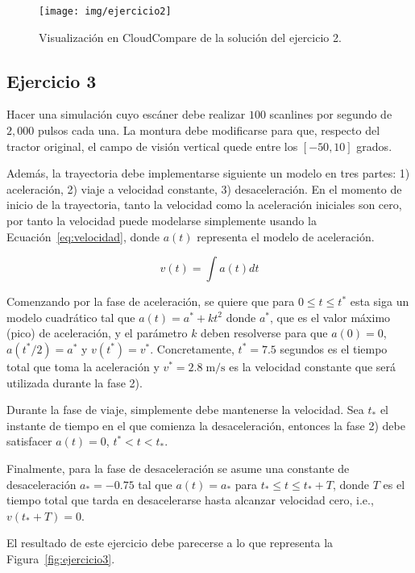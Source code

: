 \documentclass[]{article}
\begin{document}
	\begin{figure}[htb]
		\centering
		\texttt{[image: img/ejercicio2]}
		\caption{Visualización en CloudCompare de la solución del ejercicio 2.}
		\label{fig:ejercicio2}
	\end{figure} 

	
	\pagebreak


	\subsection*{Ejercicio 3}
	Hacer una simulación cuyo escáner debe realizar $100$ scanlines por segundo de $2,000$ pulsos cada una. La montura debe modificarse para que, respecto del tractor original, el campo de visión vertical quede entre los $[-50, 10]$ grados.
	
	Además, la trayectoria debe implementarse siguiente un modelo en tres partes: 1) aceleración, 2) viaje a velocidad constante, 3) desaceleración. En el momento de inicio de la trayectoria, tanto la velocidad como la aceleración iniciales son cero, por tanto la velocidad puede modelarse simplemente usando la Ecuación~\ref{eq:velocidad}, donde $a(t)$ representa el modelo de aceleración.
	
	\begin{equation}
		v(t) = \int{a(t) dt}
	\label{eq:velocidad}
	\end{equation}
	
	Comenzando por la fase de aceleración, se quiere que para $0 \leq t \leq t^*$ esta siga un modelo cuadrático tal que \mbox{$a(t) = a^* + kt^2$} donde $a^*$, que es el valor máximo (pico) de aceleración, y el parámetro $k$ deben resolverse para que $a(0)=0$, $a(t^*/2) = a^*$ y $v(t^*)=v^*$. Concretamente, $t^*=7.5$ segundos es el tiempo total que toma la aceleración y $v^*=2.8\;\mathrm{m}/\mathrm{s}$ es la velocidad constante que será utilizada durante la fase 2).
	
	Durante la fase de viaje, simplemente debe mantenerse la velocidad. Sea $t_*$ el instante de tiempo en el que comienza la desaceleración, entonces la fase 2) debe satisfacer $a(t) = 0$, $t^* < t < t_*$.
	
	Finalmente, para la fase de desaceleración se asume una constante de desaceleración $a_* = -0.75$ tal que $a(t) = a_*$ para $t_* \leq t \leq t_*+T$, donde $T$ es el tiempo total que tarda en desacelerarse hasta alcanzar velocidad cero, i.e., $v(t_*+T) = 0$.
	
	El resultado de este ejercicio debe parecerse a lo que representa la Figura~\ref{fig:ejercicio3}.
	
\end{document}
